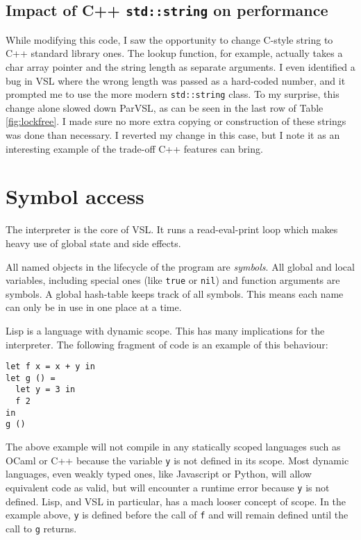 \subsection{Impact of C++ \texttt{std::string} on performance}

While modifying this code, I saw the opportunity to change C-style string to C++
standard library ones. The lookup function, for example, actually takes a char array
pointer and the string length as separate arguments. I even identified a bug
in VSL where the wrong length was passed as a hard-coded number, and it prompted
me to use the more modern \verb|std::string| class. To my surprise, this change alone
slowed down ParVSL, as can be seen in the last row of Table \ref{fig:lockfree}.
I made sure no more extra copying or construction of these strings was done than
necessary. I reverted my change in this case, but I note it as an interesting example
of the trade-off C++ features can bring.


\section{Symbol access}
\label{sec:symbols}
\label{sec:datarace}
The interpreter is the core of VSL. It runs a read-eval-print loop which makes heavy use of global state and side effects.

All named objects in the lifecycle of the program are \emph{symbols}. All global and local variables, including
special ones (like \texttt{true} or \texttt{nil}) and function arguments are symbols. A global hash-table keeps track of
all symbols. This means each name can only be in use in one place at a time.

Lisp is a language with dynamic scope. This has many implications for the interpreter. The following
fragment of code is an example of this behaviour:
\begin{verbatim}
let f x = x + y in
let g () =
  let y = 3 in
  f 2
in
g ()
\end{verbatim}

The above example will not compile in any statically scoped languages such as OCaml or C++
because the variable \texttt{y} is not defined in its scope.
Most dynamic languages, even weakly typed ones, like Javascript or Python, will allow equivalent
code as valid, but will encounter a runtime error because \texttt{y} is not defined.
Lisp, and VSL in particular, has a mach looser concept of scope.
In the example above, \texttt{y} is defined before the call of \texttt{f} and will remain defined until the
call to \texttt{g} returns.

